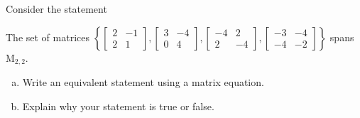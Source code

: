 
\begin{exerciseStatement}


Consider the statement 
\begin{center}\begin{minipage}{0.8\textwidth}
 The set of matrices \( \left\{ \left[\begin{array}{cc}
2 & -1 \\
2 & 1
\end{array}\right] , \left[\begin{array}{cc}
3 & -4 \\
0 & 4
\end{array}\right] , \left[\begin{array}{cc}
-4 & 2 \\
2 & -4
\end{array}\right] , \left[\begin{array}{cc}
-3 & -4 \\
-4 & -2
\end{array}\right] \right\} \) spans \(\mathrm{M}_{2,2}\). 
\end{minipage}\end{center}
    


\begin{enumerate}[(a)]
\item  Write an equivalent statement using a matrix equation.
\item  Explain why your statement is true or false.
\end{enumerate}
    
\end{exerciseStatement}
    
